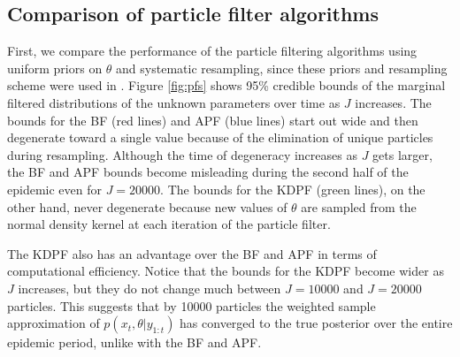 \documentclass[useAMS,referee,usenatbib]{biom}
\begin{document}


\subsection{Comparison of particle filter algorithms \label{sec:pfcomparison}}

First, we compare the performance of the particle filtering algorithms using uniform priors on $\theta$ and systematic resampling, since these priors and resampling scheme were used in \citet{skvortsov2012monitoring}.  Figure \ref{fig:pfs} shows 95\% credible bounds of the marginal filtered distributions of the unknown parameters over time as $J$ increases.  The bounds for the BF (red lines) and APF (blue lines) start out wide and then degenerate toward a single value because of the elimination of unique particles during resampling.  Although the time of degeneracy increases as $J$ gets larger, the BF and APF bounds become misleading during the second half of the epidemic even for $J = 20000$.  The bounds for the KDPF (green lines), on the other hand, never degenerate because new values of $\theta$ are sampled from the normal density kernel at each iteration of the particle filter.

The KDPF also has an advantage over the BF and APF in terms of computational efficiency.  Notice that the bounds for the KDPF become wider as $J$ increases, but they do not change much between $J = 10000$ and $J = 20000$ particles.  This suggests that by 10000 particles the weighted sample approximation of $p(x_t,\theta|y_{1:t})$ has converged to the true posterior over the entire epidemic period, unlike with the BF and APF.
\end{document}
